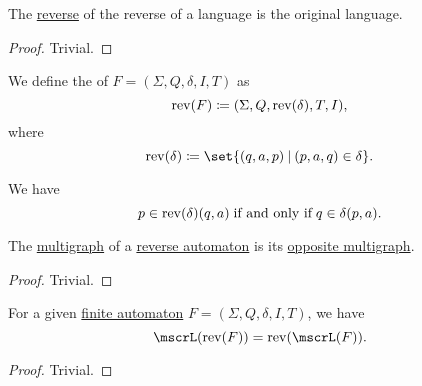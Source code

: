 \begin{proposition}\label{thm:reverse_language_involution}
  The \hyperref[def:reverse_language]{reverse} of the reverse of a language is the original language.
\end{proposition}
\begin{proof}
  Trivial.
\end{proof}

\begin{definition}\label{def:reverse_finite_automaton}\mimprovised
  We define the  of \( F = (\Sigma, Q, \delta, I, T) \) as
  \begin{equation*}
    \op{rev}(F) \coloneqq (\Sigma, Q, \op{rev}(\delta), T, I),
  \end{equation*}
  where
  \begin{equation*}
    \op{rev}(\delta) \coloneqq \set{ (q, a, p) \given (p, a, q) \in \delta }.
  \end{equation*}
\end{definition}
\begin{comments}
  \item We have
  \begin{equation*}
    p \in \op{rev}(\delta)(q, a) \T{if and only if} q \in \delta(p, a).
  \end{equation*}
\end{comments}

\begin{proposition}\label{thm:reverse_finite_automaton_graph}
  The \hyperref[def:finite_automaton/graph]{multigraph} of a \hyperref[def:reverse_finite_automaton]{reverse automaton} is its \hyperref[def:opposite_directed_multigraph]{opposite multigraph}.
\end{proposition}
\begin{proof}
  Trivial.
\end{proof}

\begin{proposition}\label{thm:reverse_finite_automaton_language}
  For a given \hyperref[def:finite_automaton]{finite automaton} \( F = (\Sigma, Q, \delta, I, T) \), we have
  \begin{equation*}
    \mscrL(\op{rev}(F)) = \op{rev}(\mscrL(F)).
  \end{equation*}
\end{proposition}
\begin{proof}
  Trivial.
\end{proof}

